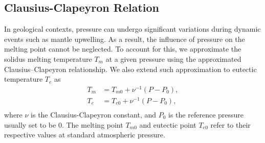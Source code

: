 \subsection{Clausius-Clapeyron Relation}
In geological contexts, pressure can undergo significant variations during 
dynamic events such as mantle upwelling. As a result, the influence of 
pressure on the melting point cannot be neglected.
To account for this, we approximate the solidus melting temperature $T_m$
at a given pressure using the approximated Clausius–Clapeyron relationship.
We also extend such approximation to eutectic temperature $T_e$ as 
\begin{equation}\label{eq:calusiusclapeyron}
\begin{aligned}
		  T_m &= T_{m0} + \nu^{-1} (P-P_0), \\
		  T_e &= T_{e0} + \nu^{-1} (P-P_0), \\
\end{aligned}
\end{equation}
where $\nu$ is the Clausius-Clapeyron constant, and
$P_0$ is the reference pressure usually set to be 0.
The melting point $T_{m0}$ and eutectic point $T_{e0}$ 
refer to their respective values at standard atmospheric pressure.

